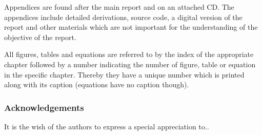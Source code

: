 Appendices are found after the main report and on an attached CD. The appendices include detailed derivations, source code, a digital version of the report and other materials which are not important for the understanding of the objective of the report.

All figures, tables and equations are referred to by the index of the appropriate chapter followed by a number indicating the number of figure, table or equation in the specific chapter. Thereby they have a unique number which is printed along with its caption (equations have no caption though).
\vspace{-0.5cm}
\subsubsection{Acknowledgements}
\vspace{-0.2cm}
It is the wish of the authors to express a special appreciation to..
\restoregeometry %
